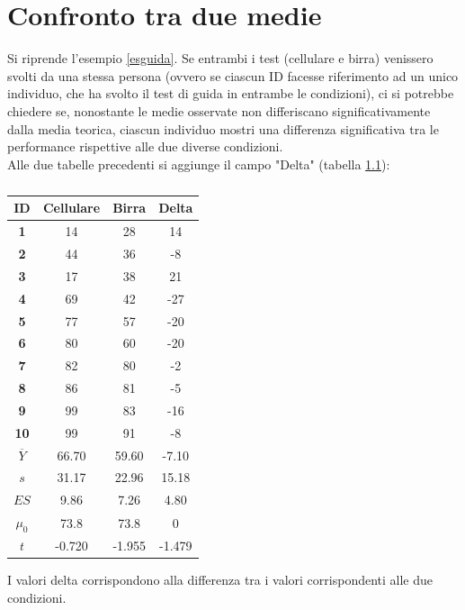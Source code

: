 \documentclass[10pt, draft]{book}
\begin{document}
\chapter{Confronto tra due medie}
Si riprende l'esempio \ref{esguida}. Se entrambi i test (cellulare e birra) venissero svolti da una stessa persona (ovvero se ciascun ID facesse riferimento ad un unico individuo, che ha svolto il test di guida in entrambe le condizioni), ci si potrebbe chiedere se, nonostante le medie osservate non differiscano significativamente dalla media teorica, ciascun individuo mostri una differenza significativa tra le performance rispettive alle due diverse condizioni.
\\
Alle due tabelle precedenti si aggiunge il campo "Delta" (tabella \ref{tabguida3}):
\begin{table}[H]
    \centering
    \renewcommand\arraystretch{1.2}
    \begin{tabular}{c|c|c||c}
    \hline
    \textbf{ID}& \textbf{Cellulare} & \textbf{Birra} & \textbf{Delta}\\
    \hline
    \textbf{1} & 14 & 28 & 14\\
    \hline
    \textbf{2} & 44 & 36 & -8\\
    \hline
    \textbf{3} & 17 & 38 & 21\\
    \hline
    \textbf{4} & 69 & 42 & -27\\
    \hline
    \textbf{5} & 77 & 57 & -20\\
    \hline
    \textbf{6} & 80 & 60 & -20\\
    \hline
    \textbf{7} & 82 & 80 & -2\\
    \hline
    \textbf{8} & 86 & 81 & -5\\
    \hline
    \textbf{9} & 99 & 83 & -16\\
    \hline
    \textbf{10} & 99 & 91 & -8\\
    \hline
    \hline
    \textbf{$\overline{Y}$} & 66.70 & 59.60 & -7.10\\
    \hline
    \textbf{$s$} & 31.17 & 22.96 & 15.18\\
    \hline
    \textbf{$ES$} & 9.86 & 7.26 & 4.80\\
    \hline
    \textbf{$\mu_0$} & 73.8 & 73.8 & 0\\
    \hline
    \textbf{$t$} & -0.720 & -1.955 & -1.479\\
    \hline
    \end{tabular}
    \caption{\small{}}
    \label{tabguida3}
\end{table}\noindent
I valori delta corrispondono alla differenza tra i valori corrispondenti alle due condizioni.
\end{document}
